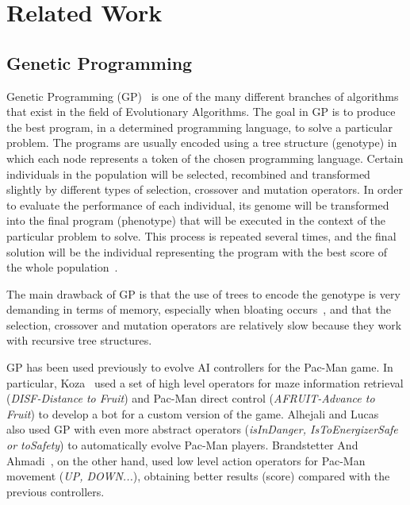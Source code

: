 \documentclass{llncs}
\begin{document}


%
\section{Related Work}
\label{sec:relatedWork}
%

\subsection{Genetic Programming}

Genetic Programming (GP)~\cite{poli_langdon_mcphee_koza_2008} is one of the many different branches of algorithms that exist in the field of Evolutionary Algorithms. The goal in GP is to produce the best program, in a determined programming language, to solve a particular problem. The programs are usually encoded using a tree structure (genotype) in which each node represents a token of the chosen programming language. Certain individuals in the population will be selected, recombined and transformed slightly by different types of selection, crossover and mutation operators.
In order to evaluate the performance of each individual, its genome will be transformed into the final program (phenotype) that will be executed in the context of the particular problem to solve. This process is repeated several times, and the final solution will be the individual representing the program with the best score of the whole population~\cite{cervigon}. 

The main drawback of GP is that the use of trees to encode the genotype is very demanding in terms of memory, especially when bloating occurs~\cite{Poli2003}, and that the selection, crossover and mutation operators are relatively slow because they work with recursive tree structures.

GP has been used previously to evolve AI controllers for the Pac-Man game. In particular, Koza~\cite{koza1992genetic} used a set of high level operators for maze information retrieval (\textit{DISF-Distance to Fruit}) and Pac-Man direct control (\textit{AFRUIT-Advance to Fruit}) to develop a bot for a custom version of the game. Alhejali and Lucas~\cite{alhejali_lucas_2010} also used GP with even more abstract operators (\textit{isInDanger, IsToEnergizerSafe or toSafety}) to automatically evolve Pac-Man players. Brandstetter And Ahmadi~\cite{brandstetter_ahmadi_2012}, on the other hand, used low level action operators for Pac-Man movement (\textit{UP, DOWN...}), obtaining better results (score) compared with the previous controllers.
\end{document}
